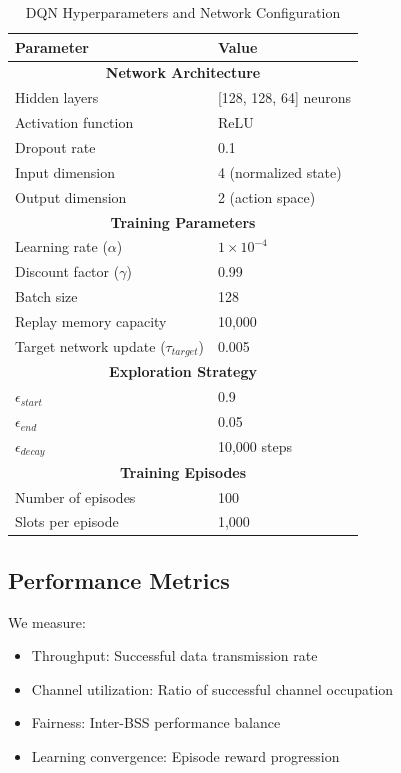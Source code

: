 \documentclass[conference]{IEEEtran}
\begin{document}
\begin{table}[htbp]
\caption{DQN Hyperparameters and Network Configuration}
\begin{center}
\begin{tabular}{|l|l|}
\hline
\textbf{Parameter} & \textbf{Value} \\
\hline
\multicolumn{2}{|c|}{\textbf{Network Architecture}} \\
\hline
Hidden layers & [128, 128, 64] neurons \\
Activation function & ReLU \\
Dropout rate & 0.1 \\
Input dimension & 4 (normalized state) \\
Output dimension & 2 (action space) \\
\hline
\multicolumn{2}{|c|}{\textbf{Training Parameters}} \\
\hline
Learning rate ($\alpha$) & $1 \times 10^{-4}$ \\
Discount factor ($\gamma$) & 0.99 \\
Batch size & 128 \\
Replay memory capacity & 10,000 \\
Target network update ($\tau_{target}$) & 0.005 \\
\hline
\multicolumn{2}{|c|}{\textbf{Exploration Strategy}} \\
\hline
$\epsilon_{start}$ & 0.9 \\
$\epsilon_{end}$ & 0.05 \\
$\epsilon_{decay}$ & 10,000 steps \\
\hline
\multicolumn{2}{|c|}{\textbf{Training Episodes}} \\
\hline
Number of episodes & 100 \\
Slots per episode & 1,000 \\
\hline
\end{tabular}
\label{tab:hyperparams}
\end{center}
\end{table}

\subsection{Performance Metrics}

We measure:
\begin{itemize}
\item Throughput: Successful data transmission rate
\item Channel utilization: Ratio of successful channel occupation
\item Fairness: Inter-BSS performance balance
\item Learning convergence: Episode reward progression
\end{itemize}
\end{document}
